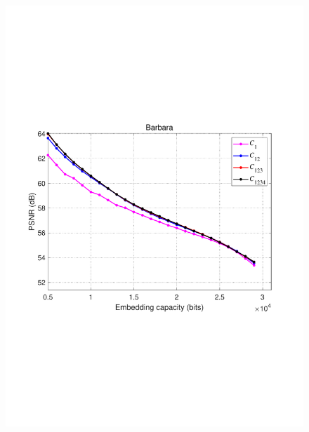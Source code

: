 \documentclass[review,3p,10pt,sort&compress]{elsarticle}
\begin{document}
\begin{figure}
{\begin{minipage}[t]{0.45\linewidth}
\includegraphics[width=1\textwidth]{figures/Result/size/Barbara.pdf}
\end{minipage}
}


\end{figure}
\end{document}
